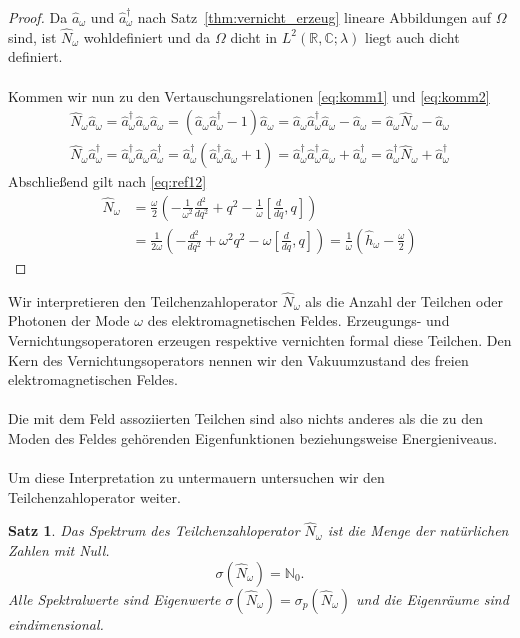 \documentclass[11pt,a4paper,leqno]{report}
\newtheorem{proposition}{Satz}[chapter]
\numberwithin{equation}{chapter}
\begin{document}
\begin{proof}
	Da $\hat{a}_\omega$ und $\hat{a}^\dagger_\omega$ nach Satz~\ref{thm:vernicht_erzeug} lineare Abbildungen auf $\Omega$ sind, ist $\hat{N}_\omega$ wohldefiniert und da $\Omega$ dicht in $L^2(\mathbb{R}, \mathbb{C}; \lambda)$ liegt auch dicht definiert.\\
	\\
	Kommen wir nun zu den Vertauschungsrelationen \eqref{eq:komm1} und \eqref{eq:komm2}
	\begin{align*}
		\hat{N}_\omega\hat{a}_\omega = \hat{a}^\dagger_\omega\hat{a}_\omega\hat{a}_\omega = (\hat{a}_\omega\hat{a}^\dagger_\omega - 1 )\hat{a}_\omega=\hat{a}_\omega\hat{a}^\dagger_\omega\hat{a}_\omega - \hat{a}_\omega = \hat{a}_\omega\hat{N}_\omega - \hat{a}_\omega
	\end{align*}
	\begin{align*}
	\hat{N}_\omega\hat{a}_\omega^\dagger = \hat{a}^\dagger_\omega\hat{a}_\omega\hat{a}_\omega^\dagger = \hat{a}^\dagger_\omega(\hat{a}_\omega^\dagger\hat{a}_\omega+1)=\hat{a}^\dagger_\omega\hat{a}_\omega^\dagger\hat{a}_\omega+\hat{a}^\dagger_\omega=\hat{a}^\dagger_\omega\hat{N}_\omega+\hat{a}^\dagger_\omega
\end{align*}
Abschlie\ss{}end gilt nach \eqref{eq:ref12}
\begin{align*}
	\hat{N}_\omega &=
	\frac{\omega}{2}(-\frac{1}{\omega^2}\frac{d^2}{dq^2}+q^2 - \frac{1}{\omega}[\frac{d}{dq},q])\\&=\frac{1}{2\omega}(-\frac{d^2}{dq^2}+\omega^2q^2 - \omega [\frac{d}{dq},q])= \frac{1}{\omega}(\hat{h}_\omega - \frac{\omega}{2} )
\end{align*}
\end{proof}
\noindent
Wir interpretieren den Teilchenzahloperator $\hat{N}_\omega$ als die Anzahl der Teilchen oder Photonen der Mode $\omega$ des elektromagnetischen Feldes. Erzeugungs- und Vernichtungsoperatoren erzeugen respektive vernichten formal diese Teilchen.
Den Kern des Vernichtungsoperators nennen wir den Vakuumzustand des freien elektromagnetischen Feldes.\\
\\
Die mit dem Feld assoziierten Teilchen sind also nichts anderes als die zu den Moden des Feldes geh\"orenden Eigenfunktionen beziehungsweise Energieniveaus.\\
\\
Um diese Interpretation zu untermauern untersuchen wir den Teilchenzahloperator weiter.
\begin{proposition}
	Das Spektrum des Teilchenzahloperator $\hat{N}_\omega$ ist die Menge der nat\"urlichen Zahlen mit Null. \label{thm:tz-spec}
	\begin{equation}
		\sigma(\hat{N}_\omega)=\mathbb{N}_0.
	\end{equation}
Alle Spektralwerte sind Eigenwerte $\sigma(\hat{N}_\omega)=\sigma_p(\hat{N}_\omega)$ und die Eigenr\"aume sind eindimensional.
\end{proposition}
\end{document}

